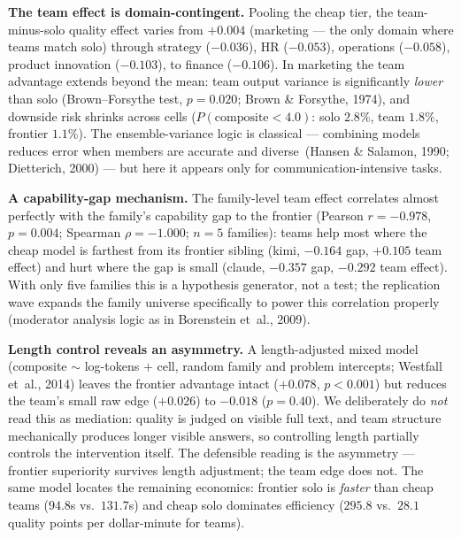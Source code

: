 \documentclass[12pt,a4paper]{article}
\begin{document}
\textbf{The team effect is domain-contingent.} Pooling the cheap tier, the
team-minus-solo quality effect varies from $+0.004$ (marketing --- the only
domain where teams match solo) through strategy ($-0.036$), HR ($-0.053$),
operations ($-0.058$), product innovation ($-0.103$), to finance
($-0.106$). In marketing the team advantage extends beyond the mean: team
output variance is significantly \emph{lower} than solo (Brown--Forsythe test,
$p = 0.020$; Brown \& Forsythe, 1974), and downside risk shrinks across cells
($P(\text{composite} < 4.0)$: solo $2.8\%$, team $1.8\%$, frontier $1.1\%$).
The ensemble-variance logic is classical --- combining models reduces error
when members are accurate and diverse~(Hansen \& Salamon, 1990; Dietterich,
2000) --- but here it appears only for communication-intensive tasks.

\textbf{A capability-gap mechanism.} The family-level team effect correlates
almost perfectly with the family's capability gap to the frontier
(Pearson $r = -0.978$, $p = 0.004$; Spearman $\rho = -1.000$; $n = 5$
families): teams help most where the cheap model is farthest from its frontier
sibling (kimi, $-0.164$ gap, $+0.105$ team effect) and hurt where the gap is
small (claude, $-0.357$ gap, $-0.292$ team effect). With only five families
this is a hypothesis generator, not a test; the replication wave expands the
family universe specifically to power this correlation properly
(moderator analysis logic as in Borenstein et~al., 2009).

\textbf{Length control reveals an asymmetry.} A length-adjusted mixed model
(composite $\sim$ log-tokens $+$ cell, random family and problem intercepts;
Westfall et~al., 2014) leaves the frontier advantage intact ($+0.078$,
$p < 0.001$) but reduces the team's small raw edge ($+0.026$) to $-0.018$
($p = 0.40$). We deliberately do \emph{not} read this as mediation: quality is
judged on visible full text, and team structure mechanically produces longer
visible answers, so controlling length partially controls the intervention
itself. The defensible reading is the asymmetry --- frontier superiority
survives length adjustment; the team edge does not. The same model locates the
remaining economics: frontier solo is \emph{faster} than cheap teams ($94.8$s
vs.\ $131.7$s) and cheap solo dominates efficiency ($295.8$ vs.\ $28.1$
quality points per dollar-minute for teams).
\end{document}

